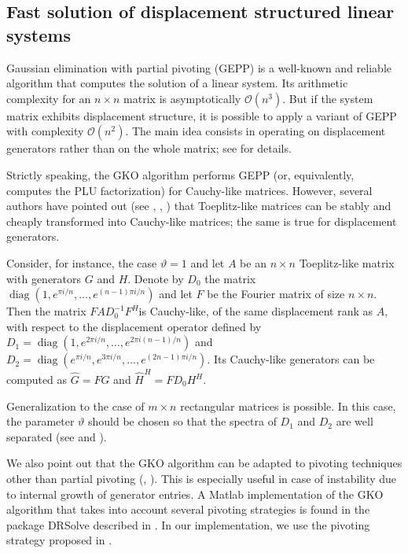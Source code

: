 \documentclass{article}
\newcommand{\tmop}[1]{\ensuremath{\operatorname{#1}}}
\begin{document}
\subsection{Fast solution of displacement structured linear systems}

Gaussian elimination with partial pivoting (GEPP) is a well-known and reliable
algorithm that computes the solution of a linear system. Its arithmetic
complexity for an $n \times n$ matrix is asymptotically $\mathcal{O}(n^3)$.
But if the system matrix exhibits displacement structure, it is possible to
apply a variant of GEPP with complexity $\mathcal{O}(n^2)$. The main idea
consists in operating on displacement generators rather than on the whole
matrix; see {\cite{GKO}} for details.

Strictly speaking, the GKO algorithm performs GEPP (or, equivalently,
computes the PLU factorization) for Cauchy-like matrices. However, several
authors have pointed out (see {\cite{GKO}}, {\cite{Hei}}, {\cite{Pan}}) that
Toeplitz-like matrices can be stably and cheaply transformed into Cauchy-like
matrices; the same is true for displacement generators.

Consider, for instance, the case $\vartheta = 1$ and let $A$ be an $n \times
n$ Toeplitz-like matrix with generators $G$ and $H$. Denote by $D_0$ the
matrix $\tmop{diag} (1, e^{\pi i / n}, \ldots, e^{(n - 1) \pi i / n})$ and let
$F$ be the Fourier matrix of size $n \times n$. Then the matrix $F A D_0^{- 1}
F^H $is Cauchy-like, of the same displacement rank as $A$, with respect to the
displacement operator defined by $D_1 = \tmop{diag} (1, e^{2 \pi i / n},
\ldots, e^{2 \pi i (n - 1) / n})$ and $D_2 = \tmop{diag} (e^{\pi i / n}, e^{3
\pi i / n}, \ldots, e^{(2 n - 1) \pi i / n})$. Its Cauchy-like generators can
be computed as $\hat{G} = F G$ and $\widehat{H^{}}^H = F D_0 H^H$.

Generalization to the case of $m \times n$ rectangular matrices is possible.
In this case, the parameter $\vartheta$ should be chosen so that the spectra
of $D_1$ and $D_2$ are well separated (see {\cite{AR}} and {\cite{BB}}).

We also point out that the GKO algorithm can be adapted to pivoting techniques
other than partial pivoting ({\cite{Gu}}, {\cite{Ste}}). This is especially
useful in case of instability due to internal growth of generator entries. A
Matlab implementation of the GKO algorithm that takes into account several
pivoting strategies is found in the package DRSolve described in {\cite{AR}}.
In our implementation, we use the pivoting strategy proposed in {\cite{Gu}}.
\end{document}
